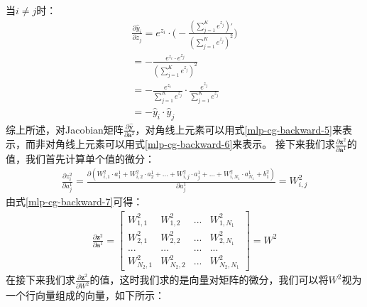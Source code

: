 \documentclass[UTF8]{article}
\begin{document}
当$i \ne j$时：
\begin{equation}
\begin{aligned}
\frac{\partial{\hat{y}_i}}{\partial{z_j}}=e^{z_i} \cdot \bigg( -\frac{(\sum_{j=1}^{K}e^{z_j})'}{(\sum_{j=1}^{K}e^{z_j})^2} \bigg)\\
=-\frac{e^{z_i} \cdot e^{z_j}}{(\sum_{j=1}^{K}e^{z_j})^2}\\
=-\frac{e^{z_i}}{\sum_{j=1}^{K}e^{z_j}} \cdot \frac{e^{z_j}}{\sum_{j=1}^{K}e^{z_j}}\\
=-\hat{y}_i \cdot \hat{y}_j
\end{aligned}
\label{mlp-cg-backward-6}
\end{equation}
综上所述，对Jacobian矩阵$\frac{\partial{\hat{\boldsymbol{y}}}}{\partial{\boldsymbol{a}^2}}$，对角线上元素可以用式\ref{mlp-cg-backward-5}来表示，而非对角线上元素可以用式\ref{mlp-cg-backward-6}来表示。\newline
接下来我们求$\frac{\partial{\boldsymbol{z}^2}}{\partial{\boldsymbol{a}^1}}$的值，我们首先计算单个值的微分：
\begin{equation}
\begin{aligned}
\frac{\partial{z^2_i}}{\partial{a^1_j}}=\frac{\partial{(W^2_{i,1}\cdot a^1_1 + W^2_{i,2}\cdot a^1_2 + ... + W^2_{i,j}\cdot a^1_{j} + ... + W^2_{i,N_1}\cdot a^1_{N_1} + b^2_1)}} {\partial{a^1_j}}=W^2_{i,j}
\end{aligned}
\label{mlp-cg-backward-7}
\end{equation}
由式\ref{mlp-cg-backward-7}可得：
\begin{equation}
\begin{aligned}
\frac{\partial{\boldsymbol{z}^2}}{\partial{\boldsymbol{a}^1}}=\begin{bmatrix}
W^2_{1,1} & W^2_{1,2} & ... & W^2_{1,N_1} \\
W^2_{2,1} & W^2_{2,2} & ... & W^2_{2,N_1} \\
... & ... & ... & ... \\

W^2_{N_2,1} & W^2_{N_2,2} & ... & W^2_{N_2,N_1}
\end{bmatrix}=W^2
\end{aligned}
\label{mlp-cg-backward-8}
\end{equation}
在接下来我们求$\frac{\partial{\boldsymbol{z}^2}}{\partial{W^2}}$的值，这时我们求的是向量对矩阵的微分，我们可以将$W^2$视为一个行向量组成的向量，如下所示：
\end{document}
